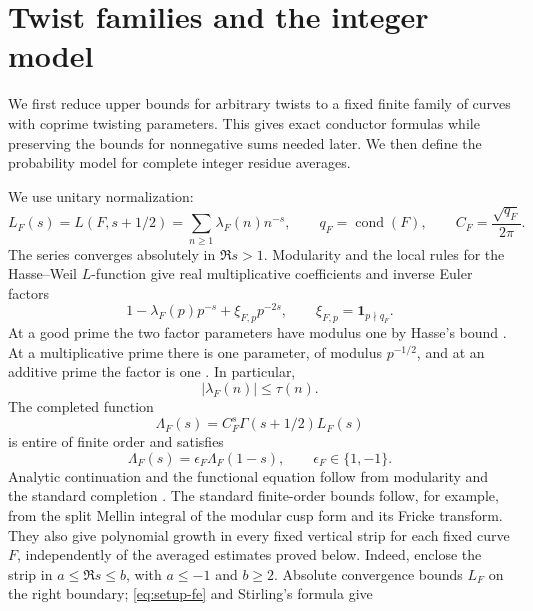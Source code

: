 \section{Twist families and the integer model}\label{sec:setup}

We first reduce upper bounds for arbitrary twists to a fixed finite
family of curves with coprime twisting parameters. This gives exact
conductor formulas while preserving the bounds for nonnegative sums
needed later. We then define the probability model for complete integer
residue averages.

We use unitary normalization:
\[
 L_F(s)=L(F,s+1/2)=\sum_{n\ge1}\lambda_F(n)n^{-s},
 \qquad q_F=\operatorname{cond}(F),
 \qquad C_F=\frac{\sqrt{q_F}}{2\pi}.
\]
The series converges absolutely in \(\Re s>1\).
Modularity and the local rules for the Hasse--Weil \(L\)-function give
real multiplicative coefficients and inverse Euler factors
\begin{equation}\label{eq:setup-euler}
 1-\lambda_F(p)p^{-s}+\xi_{F,p}p^{-2s},
 \qquad \xi_{F,p}=\mathbf 1_{p\nmid q_F}.
\end{equation}
At a good prime the two factor parameters have modulus one by Hasse's
bound \cite[Chapter~V, Theorem~2.3.1(a)]{Silverman2009}.
At a multiplicative prime there is one parameter, of modulus
\(p^{-1/2}\), and at an additive prime the factor is one
\cite[Definitions~17--18 and Theorem~19]{DokchitserAnni2014}.
In particular,
\begin{equation}\label{eq:setup-coefficients}
 |\lambda_F(n)|\le\tau(n).
\end{equation}
The completed function
\[
 \Lambda_F(s)=C_F^s\Gamma(s+1/2)L_F(s)
\]
is entire of finite order and satisfies
\begin{equation}\label{eq:setup-fe}
 \Lambda_F(s)=\epsilon_F\Lambda_F(1-s),\qquad \epsilon_F\in\{1,-1\}.
\end{equation}
Analytic continuation and the functional equation follow from
modularity \cite[Theorem~A]{BreuilConradDiamondTaylor2001}
and the standard completion
\cite[Appendix~C, Theorems~16.3--16.4]{Silverman2009}.
The standard finite-order bounds follow, for example, from the split
Mellin integral of the modular cusp form and its Fricke transform.
They also give polynomial growth in every fixed vertical strip for each
fixed curve \(F\), independently of the averaged estimates proved below.
Indeed, enclose the strip in \(a\le\Re s\le b\), with \(a\le-1\) and
\(b\ge2\). Absolute convergence bounds \(L_F\) on the right boundary;
\eqref{eq:setup-fe} and Stirling's formula give
